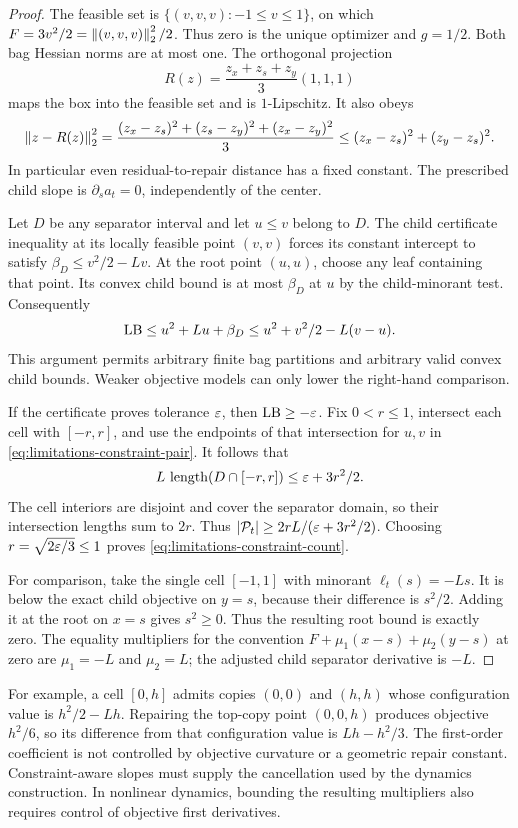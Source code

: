 \begin{proof}
The feasible set is $\{(v,v,v):-1\le v\le1\}$, on which
$F=3v^2/2=\left\lVert (v,v,v)\right\rVert_2^2/2$. Thus zero is the unique optimizer
and $g=1/2$. Both bag Hessian norms are at most one. The orthogonal
projection
\[
 R(z)=\frac{z_x+z_s+z_y}{3}(1,1,1)
\]
maps the box into the feasible set and is $1$-Lipschitz. It also obeys
\[
 \left\lVert z-R(z)\right\rVert_2^2
 =\frac{(z_x-z_s)^2+(z_s-z_y)^2+(z_x-z_y)^2}{3}
 \le(z_x-z_s)^2+(z_y-z_s)^2.
\]
In particular even residual-to-repair distance has a fixed constant.
The prescribed child slope is $\partial_s a_t=0$, independently of
the center.

Let $D$ be any separator interval and let $u\le v$ belong to $D$.
The child certificate inequality at its locally feasible point $(v,v)$
forces its constant intercept to satisfy
$\beta_D\le v^2/2-Lv$. At the root point $(u,u)$, choose any leaf
containing that point. Its convex child bound is at most $\beta_D$
at $u$ by the child-minorant test. Consequently
\begin{equation}\label{eq:limitations-constraint-pair}
 \mathrm{LB}\le u^2+Lu+\beta_D
       \le u^2+v^2/2-L(v-u).
\end{equation}
This argument permits arbitrary finite bag partitions and arbitrary
valid convex child bounds. Weaker objective models can only lower the
right-hand comparison.

If the certificate proves tolerance $\varepsilon$, then $\mathrm{LB}\ge-\varepsilon$.
Fix $0<r\le1$, intersect each cell with $[-r,r]$, and use the
endpoints of that intersection for $u,v$ in
\cref{eq:limitations-constraint-pair}. It follows that
\[
 L\,\operatorname{length}(D\cap[-r,r])\le\varepsilon+3r^2/2.
\]
The cell interiors are disjoint and cover the separator domain, so
their intersection lengths sum to $2r$. Thus
$|\mathcal P_t|\ge2rL/(\varepsilon+3r^2/2)$. Choosing
$r=\sqrt{2\varepsilon/3}\le1$ proves
\cref{eq:limitations-constraint-count}.

For comparison, take the single cell $[-1,1]$ with minorant
$\ell_t(s)=-Ls$. It is below the exact child objective on $y=s$,
because their difference is $s^2/2$. Adding it at the root on $x=s$
gives $s^2\ge0$. Thus the resulting root bound is exactly zero.
The equality multipliers for the convention
$F+\mu_1(x-s)+\mu_2(y-s)$ at zero are $\mu_1=-L$ and
$\mu_2=L$; the adjusted child separator derivative is $-L$.
\end{proof}

For example, a cell $[0,h]$ admits copies $(0,0)$ and $(h,h)$ whose
configuration value is $h^2/2-Lh$. Repairing the top-copy point
$(0,0,h)$ produces objective $h^2/6$, so its difference from that
configuration value is $Lh-h^2/3$. The first-order coefficient is not
controlled by objective curvature or a geometric repair constant.
Constraint-aware slopes must supply the cancellation used by the dynamics
construction. In nonlinear dynamics, bounding the resulting multipliers
also requires control of objective first derivatives.

